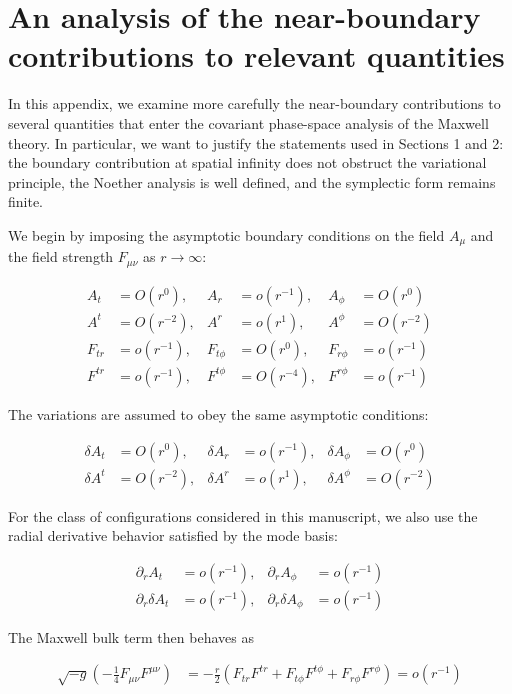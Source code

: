 \section{An analysis of the near-boundary contributions to relevant quantities}\label{app:falloffs-variational-principle}

In this appendix, we examine more carefully the near-boundary contributions to several quantities that enter the covariant phase-space analysis of the Maxwell theory. In particular, we want to justify the statements used in Sections 1 and 2: the boundary contribution at spatial infinity does not obstruct the variational principle, the Noether analysis is well defined, and the symplectic form remains finite.

We begin by imposing the asymptotic boundary conditions on the field $A_\mu$ and the field strength $F_{\mu \nu}$ as $r \to \infty$:

\begin{align}
A_{t} & =O(r^{0}), & A_{r} & =o(r^{-1}), & A_{\phi} & =O(r^{0}) \\
A^{t} & =O(r^{-2}), & A^{r} & =o(r^{1}), & A^{\phi} & =O(r^{-2}) \\
F_{tr} & =o(r^{-1}), & F_{t\phi} & =O(r^{0}), & F_{r\phi} & =o(r^{-1}) \\
F^{tr} & =o(r^{-1}), & F^{t\phi} & =O(r^{-4}), & F^{r\phi} & =o(r^{-1})
\end{align}

The variations are assumed to obey the same asymptotic conditions:

\begin{align}
\delta A_{t} & =O(r^{0}), & \delta A_{r} & =o(r^{-1}), & \delta A_{\phi} & =O(r^{0}) \\
\delta A^{t} & =O(r^{-2}), & \delta A^{r} & =o(r^{1}), & \delta A^{\phi} & =O(r^{-2})
\end{align}

For the class of configurations considered in this manuscript, we also use the radial derivative behavior satisfied by the mode basis:

\begin{align}
\partial_{r}A_{t} & =o(r^{-1}), & \partial_{r}A_{\phi} & =o(r^{-1}) \\
\partial_{r}\delta A_{t} & =o(r^{-1}), & \partial_{r}\delta A_{\phi} & =o(r^{-1})
\end{align}

The Maxwell bulk term then behaves as

\begin{align}
\sqrt{-g}\left(-\frac{1}{4}F_{\mu \nu}F^{\mu \nu}\right)
&=-\frac{r}{2}\left(F_{tr}F^{tr}+F_{t\phi}F^{t\phi}+F_{r\phi}F^{r\phi}\right)=o(r^{-1})
\end{align}

